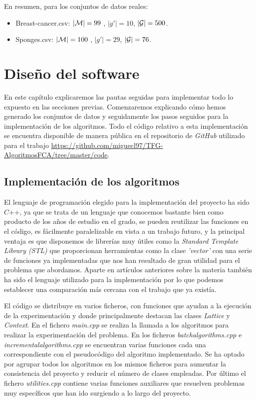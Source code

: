 \documentclass[oneside,openright,titlepage,numbers=noenddot,openany,headinclude,footinclude=true,
cleardoublepage=empty,abstractoff,BCOR=5mm,paper=a4,fontsize=12pt,main=spanish]{scrreprt}
\begin{document}
En resumen, para los conjuntos de datos reales:
\begin{itemize}
    \item Breast-cancer.csv: \textbf{$|\mathcal{M}|=99$} , \textbf{$|g'|=10$}, \textbf{$|\mathcal{G}|=500$}.
    \item Sponges.csv: \textbf{$|\mathcal{M}|=100$} , \textbf{$|g'|=29$}, \textbf{$|\mathcal{G}|=76$}.
\end{itemize}

\chapter{Diseño del software}
   \label{chap:6}
En este capítulo explicaremos las pautas seguidas para implementar todo lo expuesto en las secciones previas. Comenzaremos explicando cómo hemos generado los conjuntos de datos y seguidamente los pasos seguidos para la implementación de los algoritmos. Todo el código relativo a esta implementación se encuentra disponible de manera pública en el repositorio de \textit{GitHub} utilizado para el trabajo \url{https://github.com/miguecl97/TFG-AlgoritmosFCA/tree/master/code}.

\section{Implementación de los algoritmos}

El lenguaje de programación elegido para la implementación del proyecto ha sido $C$++, ya que se trata de un lenguaje que conocemos bastante bien como producto de los años de estudio en el grado, se pueden reutilizar las funciones en el código, es fácilmente paralelizable en vista a un trabajo futuro, y la principal ventaja es que disponemos de librerías muy útiles como la \textit{Standard Template Library (STL)} que proporcionan herramientas como la clase \textit{'vector'} con una serie de funciones ya implementadas que nos han resultado de gran utilidad para el problema que abordamos. Aparte en artículos  anteriores sobre la materia \cite{comparingperformance} también ha sido el lenguaje utilizado para la implementación por lo que podemos establecer una comparación más cercana con el trabajo que ya existía.

El código se distribuye en varios ficheros, con funciones que ayudan a la ejecución de la experimentación y donde principalmente destacan las clases \textit{Lattice} y \textit{Context}. En el fichero \textit{main.cpp} se realiza la llamada a los algoritmos para realizar la experimentación del problema. En los ficheros \textit{batchalgorithms.cpp} e \textit{incrementalalgorithms.cpp} se encuentran varias funciones cada una correspondiente con el pseudocódigo del algoritmo implementado. Se ha optado por agrupar todos los algoritmos en los mismos ficheros para aumentar la consistencia del proyecto y reducir el número de clases empleadas. Por último el fichero \textit{utilities.cpp} contiene varias funciones auxiliares que resuelven problemas muy específicos que han ido surgiendo a lo largo del proyecto.
\end{document}
